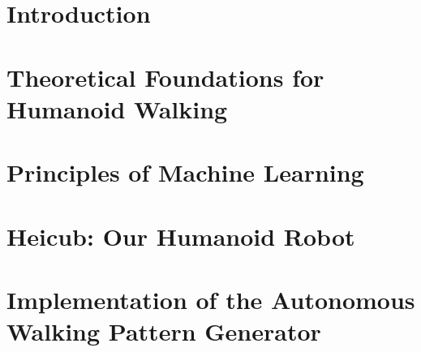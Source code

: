 \documentclass  [
paper    = a4,
BCOR     = 10mm,
twoside,
fontsize = 12pt,
toc      = bibnumbered,
toc      = listofnumbered,
numbers  = noendperiod,
headings = normal,
listof   = leveldown,
version  = 3.03
]                                       {scrreprt}
\begin{document}
	
	
	\tableofcontents
	
	\chapter{Introduction}
	
	
	\chapter{Theoretical Foundations for Humanoid Walking}
	
	\chapter{Principles of Machine Learning}

	\chapter{Heicub: Our Humanoid Robot}
	

	\chapter{Implementation of the Autonomous Walking Pattern Generator}
	
	
	
	
	
\end{document}
